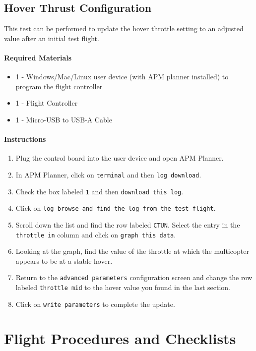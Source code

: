 \documentclass[10pt,letterpaper]{article}
\begin{document}
\subsection{Hover Thrust Configuration}

This test can be performed to update the hover throttle setting to an adjusted value after an initial test flight.

\paragraph{Required Materials}
\begin{itemize}
    \item 1 - Windows/Mac/Linux user device (with APM planner installed) to program the flight controller 
\item 1 - Flight Controller
\item 1 - Micro-USB to USB-A Cable
\end{itemize}

\paragraph{Instructions}
\begin{enumerate}
    \item Plug the control board into the user device and open APM Planner.
    \item In APM Planner, click on \texttt{terminal} and then \texttt{log download}. 
    \item Check the box labeled \texttt{1} and then \texttt{download this log}. 
    \item Click on \texttt{log browse and find the log from the test flight}. 
    \item Scroll down the list and find the row labeled \texttt{CTUN}. Select the entry in the \texttt{throttle in} column and click on \texttt{graph this data}.
    \item Looking at the graph, find the value of the throttle at which the multicopter appears to be at a stable hover.
    \item Return to the \texttt{advanced parameters} configuration screen and change the row labeled \texttt{throttle mid} to the hover value you found in the last section. 
    \item Click on \texttt{write parameters} to complete the update.

\end{enumerate}

\clearpage
\section{Flight Procedures and Checklists}

\end{document}
